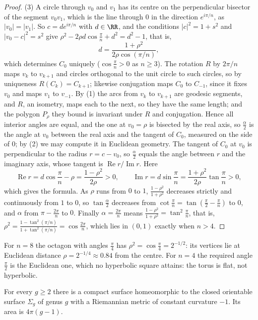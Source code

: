 \begin{proof}
(3) A circle through $v_0$ and $v_1$ has its centre on the perpendicular bisector of the segment $v_0v_1$, which is the line through $0$ in the direction $e^{i\pi/n}$, as $|v_0| = |v_1|$. So
$c = de^{i\pi/n}$ with $d \in \RR$, and the conditions $|c|^2 = 1 + s^2$ and $|v_0 - c|^2 = s^2$ give $\rho^2 - 2\rho d\cos\frac{\pi}{n} + d^2 = d^2 - 1$, that is,
\[
d = \frac{1 + \rho^2}{2\rho\cos(\pi/n)} ,
\]
which determines $C_0$ uniquely ($\cos\frac{\pi}{n} > 0$ as $n \geq 3$). The rotation $R$ by $2\pi/n$ maps $v_k$ to $v_{k+1}$ and circles orthogonal to the unit circle to such circles, so by uniqueness
$R(C_k) = C_{k+1}$; likewise conjugation maps $C_0$ to $C_{-1}$, since it fixes $v_0$ and maps $v_1$ to $v_{-1}$. By (1) the arcs from $v_k$ to $v_{k+1}$ are geodesic segments, and $R$, an isometry, maps
each to the next, so they have the same length; and the polygon $P_\rho$ they bound is invariant under $R$ and conjugation. Hence all interior angles are equal, and the one at $v_0 = \rho$ is bisected by
the real axis, so $\frac{\alpha}{2}$ is the angle at $v_0$ between the real axis and the tangent of $C_0$, measured on the side of $0$; by (2) we may compute it in Euclidean geometry. The tangent of
$C_0$ at $v_0$ is perpendicular to the radius $r = c - v_0$, so $\frac{\alpha}{2}$ equals the angle between $r$ and the imaginary axis, whose tangent is $\operatorname{Re}r/\operatorname{Im}r$. Here
\[
\operatorname{Re}r = d\cos\frac{\pi}{n} - \rho = \frac{1 - \rho^2}{2\rho} > 0, \qquad \operatorname{Im}r = d\sin\frac{\pi}{n} = \frac{1 + \rho^2}{2\rho}\tan\frac{\pi}{n} > 0,
\]
which gives the formula. As $\rho$ runs from $0$ to $1$, $\frac{1 - \rho^2}{1 + \rho^2}$ decreases strictly and continuously from $1$ to $0$, so $\tan\frac{\alpha}{2}$ decreases from
$\cot\frac{\pi}{n} = \tan(\frac{\pi}{2} - \frac{\pi}{n})$ to $0$, and $\alpha$ from $\pi - \frac{2\pi}{n}$ to $0$. Finally $\alpha = \frac{2\pi}{n}$ means $\frac{1 - \rho^2}{1 + \rho^2} = \tan^2\frac{\pi}{n}$,
that is, $\rho^2 = \frac{1 - \tan^2(\pi/n)}{1 + \tan^2(\pi/n)} = \cos\frac{2\pi}{n}$, which lies in $(0, 1)$ exactly when $n > 4$.
\end{proof}

For $n = 8$ the octagon with angles $\frac{\pi}{4}$ has $\rho^2 = \cos\frac{\pi}{4} = 2^{-1/2}$: its vertices lie at Euclidean distance $\rho = 2^{-1/4} \approx 0.84$ from the centre. For $n = 4$ the required angle $\frac{\pi}{2}$ is the Euclidean one, which no hyperbolic square attains: the torus is flat, not hyperbolic.

\begin{proposition}\label{riemannian-geometry:proposition-hyperbolic-surfaces}
For every $g \geq 2$ there is a compact surface homeomorphic to the closed orientable surface $\Sigma_g$ of genus $g$ with a Riemannian metric of constant curvature $-1$. Its area is $4\pi(g - 1)$.
\end{proposition}

